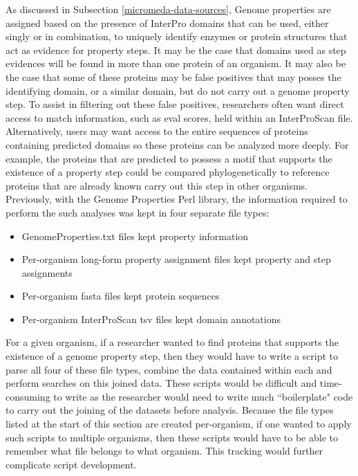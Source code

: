 As discussed in Subsection \ref{micromeda-data-sources}, Genome properties are 
assigned based on the presence of InterPro domains that can be used, either 
singly or in combination, to uniquely identify enzymes or protein structures 
that act as evidence for property steps. It may be the case that domains used as 
step evidences will be found in more than one protein of an organism. It may 
also be the case that some of these proteins may be false positives that may 
posses the identifying domain, or a similar domain, but do not carry out a 
genome property step. To assist in filtering out these false positives, 
researchers often want direct access to match information, such as \gls{eval} 
scores, held within an InterProScan file. Alternatively, users may want access 
to the entire sequences of proteins containing predicted domains so these 
proteins can be analyzed more deeply. For example, the proteins that are 
predicted to possess a motif that supports the existence of a property step 
could be compared phylogenetically to reference proteins that are already known 
carry out this step in other organisms. Previously, with the Genome Properties 
Perl library, the information required to perform the such analyses was kept in 
four separate file types:

\FloatBarrier
\begin{itemize}
\item GenomeProperties.txt files kept property information
\item Per-organism long-form property assignment files kept property and step 
assignments
\item Per-organism \gls{fasta} files \cite{pearson19905} kept protein sequences 
\item  Per-organism InterProScan \gls{tsv} files kept domain annotations 
\end{itemize}

For a given organism, if a researcher wanted to find proteins that supports the 
existence of a genome property step, then they would have to write a script to 
parse all four of these file types, combine the data contained within each and 
perform searches on this joined data. These scripts would be difficult and 
time-consuming to write as the researcher would need to write much 
``boilerplate" code to carry out the joining of the datasets before analysis. 
Because the file types listed at the start of this section are created 
per-organism, if one wanted to apply such scripts to multiple organisms, then 
these scripts would have to be able to remember what file belongs to what 
organism. This tracking would further complicate script development.

